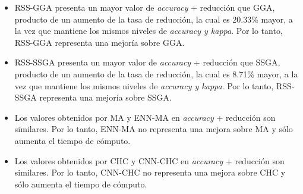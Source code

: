 \begin{itemize}

\item RSS-GGA presenta un mayor valor de \emph{accuracy} + reducción que GGA, producto de un aumento de la tasa de reducción, la cual es 20.33\% mayor, a la vez que mantiene los mismos niveles de \emph{accuracy y kappa}. Por lo tanto, RSS-GGA representa una mejoría sobre GGA.

\item RSS-SSGA presenta un mayor valor de \emph{accuracy} + reducción que SSGA, producto de un aumento de la tasa de reducción, la cual es 8.71\% mayor, a la vez que mantiene los mismos niveles de \emph{accuracy y kappa}. Por lo tanto, RSS-SSGA representa una mejoría sobre SSGA.

\item Los valores obtenidos por MA y ENN-MA en \emph{accuracy} + reducción son similares. Por lo tanto, ENN-MA no representa una mejora sobre MA y sólo aumenta el tiempo de cómputo.

\item  Los valores obtenidos por CHC y CNN-CHC en \emph{accuracy} + reducción son similares. Por lo tanto, CNN-CHC no representa una mejora sobre CHC y sólo aumenta el tiempo de cómputo.

\end{itemize}

\newpage


